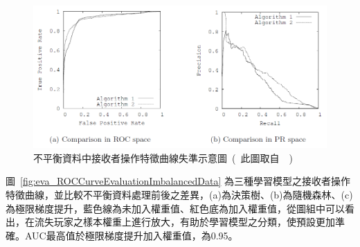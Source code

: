\begin{figure}[!htb]
    \begin{center}
      \includegraphics[width=1\textwidth]{figures/evaluation/Image_GoodROCBadPR.png}
      \caption[不平衡資料中接收者操作特徵曲線失準示意圖]{不平衡資料中接收者操作特徵曲線失準示意圖\ (\ 此圖取自~\cite{davis2006relationship}\ )}
      \label{fig:eva_GoodROCBadPR}
    \end{center}
\end{figure}
\newpage

圖~\ref{fig:eva_ROCCurveEvaluationImbalancedData} 為三種學習模型之接收者操作特徵曲線，並比較不平衡資料處理前後之差異，(a)為決策樹、(b)為隨機森林、(c)為極限梯度提升，藍色線為未加入權重值、紅色底為加入權重值，從圖組中可以看出，在流失玩家之樣本權重上進行放大，有助於學習模型之分類，使預設更加準確。AUC最高值於極限梯度提升加入權重值，為0.95。

